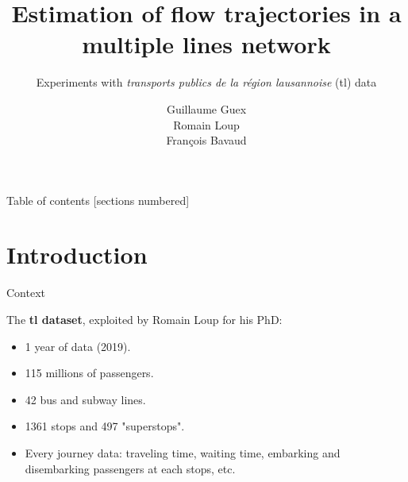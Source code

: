 \documentclass[10pt]{beamer}
\title{Estimation of flow trajectories in a multiple lines network}
\subtitle{Experiments with \textit{transports publics de la région lausannoise} (tl) data}
\date{}
\author{Guillaume Guex \\ Romain Loup \\ François Bavaud}
\institute{University of Lausanne}
\newcommand{\imp}[1]{\textbf{\color{cyan}#1}}
\begin{document}
	
	
	\maketitle
	
	
	\begin{frame}{Table of contents}
		[sections numbered]
		\tableofcontents%
	\end{frame}

	
	\section[Introduction]{Introduction}
	
	
	\begin{frame}{Context}
		
		The \imp{tl dataset}, exploited by Romain Loup for his PhD:
		
		\begin{itemize}
			\item 1 year of data (2019).
			\item 115 millions of passengers.
			\item 42 bus and subway lines.
			\item 1361 stops and 497 "superstops".
			\item Every journey data: traveling time, waiting time, embarking and disembarking passengers at each stops, etc.
		\end{itemize}
		
	\end{frame}

	
\end{document}
